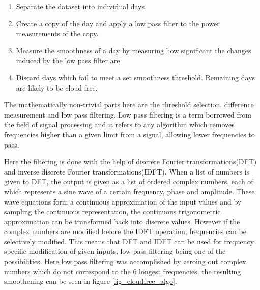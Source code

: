 





\begin{enumerate}
  \item Separate the dataset into individual days.
  
  \item Create a copy of the day and apply a low pass filter to the power measurements of the copy.
  
  \item Measure the smoothness of a day by measuring how significant the changes induced by the low pass filter are.
  
  \item Discard days which fail to meet a set smoothness threshold. Remaining days are likely to be cloud free.
  
  
  
\end{enumerate}



\noindent The mathematically non-trivial parts here are the threshold selection, difference measurement and low pass filtering. Low pass filtering is a term borrowed from the field of signal processing and it refers to any algorithm which removes frequencies higher than a given limit from a signal, allowing lower frequencies to pass. 



Here the filtering is done with the help of discrete Fourier transformations(DFT) and inverse discrete Fourier transformations(IDFT). When a list of numbers is given to DFT, the output is given as a list of ordered complex numbers, each of which represents a sine wave of a certain frequency, phase and amplitude. These wave equations form a continuous approximation of the input values and by sampling the continuous representation, the continuous trigonometric approximation can be transformed back into discrete values. However if the complex numbers are modified before the IDFT operation, frequencies can be selectively modified. This means that DFT and IDFT can be used for frequency specific modification of given inputs, low pass filtering being one of the possibilities. Here low pass filtering was accomplished by zeroing out complex numbers which do not correspond to the 6 longest frequencies, the resulting smoothening can be seen in figure \ref{fig_cloudfree_algo}.



